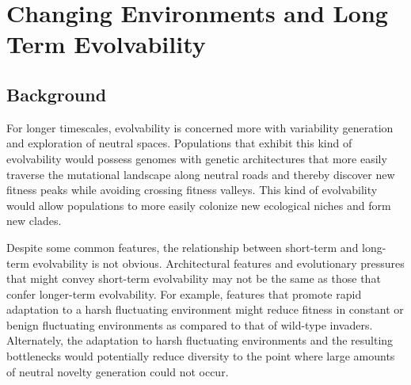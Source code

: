 \documentclass[PhD]{msu-thesis}
\begin{document}
\chapter{Changing Environments and Long Term Evolvability}
\label{chap:ce-longterm}
\section{Background}

For longer timescales,
evolvability is concerned more with variability generation and exploration of neutral spaces. Populations that exhibit this kind of evolvability would possess genomes with genetic architectures
that more easily traverse the mutational landscape along neutral roads and thereby discover new fitness peaks while avoiding crossing fitness valleys. This kind of evolvability would allow populations to more easily colonize new ecological niches and form new clades\cite{kirschner_evolvability_1998,brookfield_evolution:_2001}.

Despite some common features, the relationship between short-term and long-term evolvability is not obvious. Architectural features and evolutionary pressures that might convey short-term evolvability may not be the same as those that confer longer-term evolvability\cite{pigliucci_is_2008}. For example, features that promote rapid adaptation to a harsh fluctuating environment might reduce fitness in constant or benign fluctuating environments as compared to that of wild-type invaders. Alternately, the adaptation to harsh fluctuating environments and the resulting bottlenecks would potentially reduce diversity to the point where large amounts of neutral novelty generation could not occur.
\end{document}
